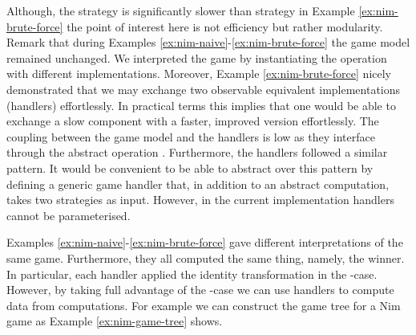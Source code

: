 Although, the  strategy is significantly slower than  strategy in Example \ref{ex:nim-brute-force} the point of interest here is not efficiency but rather modularity. Remark that during Examples \ref{ex:nim-naive}-\ref{ex:nim-brute-force} the game model remained unchanged. We interpreted the game by instantiating the operation  with different implementations. 
Moreover, Example \ref{ex:nim-brute-force} nicely demonstrated that we may exchange two observable equivalent implementations (handlers) effortlessly. In practical terms this implies that one would be able to exchange a slow component with a faster, improved version effortlessly. The coupling between the game model and the handlers is low as they interface through the abstract operation . Furthermore, the handlers followed a similar pattern. It would be convenient to be able to abstract over this pattern by defining a generic game handler that, in addition to an abstract computation, takes two strategies as input. However, in the current implementation handlers cannot be parameterised.

Examples \ref{ex:nim-naive}-\ref{ex:nim-brute-force} gave different interpretations of the same game. Furthermore, they all computed the same thing, namely, the winner. In particular, each handler applied the identity transformation in the -case. However, by taking full advantage of the -case we can use handlers to compute data from computations. For example we can construct the game tree for a Nim game as Example \ref{ex:nim-game-tree} shows. 

